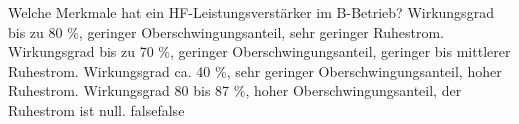     {Welche Merkmale hat ein HF-Leistungsverstärker im B-Betrieb?}
    {Wirkungsgrad bis zu 80 \%, geringer Oberschwingungsanteil, sehr geringer Ruhestrom.}
    {Wirkungsgrad bis zu 70 \%, geringer Oberschwingungsanteil, geringer bis mittlerer Ruhestrom.}
    {Wirkungsgrad ca. 40 \%, sehr geringer Oberschwingungsanteil, hoher Ruhestrom.}
    {Wirkungsgrad 80 bis 87 \%, hoher Oberschwingungsanteil, der Ruhestrom ist null.}
    {false}{false}